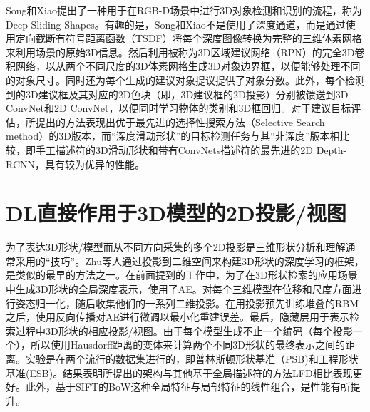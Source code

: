 \documentclass[twoside,UTF8]{nputhesis}
\begin{document}
Song和Xiao\cite{Song2015Deep}提出了一种用于在RGB-D场景中进行3D对象检测和识别的流程，称为Deep Sliding Shapes。有趣的是，Song和Xiao不是使用了深度通道，而是通过使用定向截断有符号距离函数（TSDF）将每个深度图像转换为完整的三维体素网格来利用场景的原始3D信息。然后利用被称为3D区域建议网络（RPN）的完全3D卷积网络，以从两个不同尺度的3D体素网格生成3D对象边界框，以便能够处理不同的对象尺寸。同时还为每个生成的建议对象提议提供了对象分数。此外，每个检测到的3D建议框及其对应的2D色块（即，3D建议框的2D投影）分别被馈送到3D ConvNet和2D ConvNet，以便同时学习物体的类别和3D框回归。对于建议目标评估，所提出的方法表现出优于最先进的选择性搜索方法（Selective Search method）\cite{Uijlings2013Selective}的3D版本，而“深度滑动形状”\cite{Song2015Deep}的目标检测任务与其“非深度”版本相比较，即手工描述符的3D滑动形状\cite{Song2014Sliding}和带有ConvNets描述符的最先进的2D Depth-RCNN\cite{Gupta2014Learning}，具有较为优异的性能。


\section{DL直接作用于3D模型的2D投影/视图}
为了表达3D形状/模型而从不同方向采集的多个2D投影是三维形状分析和理解通常采用的“技巧”。Zhu等人\cite{}通过投影到二维空间来构建3D形状的深度学习的框架，是类似的最早的方法之一。在前面提到的工作中，为了在3D形状检索的应用场景中生成3D形状的全局深度表示，使用了AE。对每个三维模型在位移和尺度方面进行姿态归一化，随后收集他们的一系列二维投影。在用投影预先训练堆叠的RBM之后，使用反向传播对AE进行微调以最小化重建误差。最后，隐藏层用于表示检索过程中3D形状的相应投影/视图。由于每个模型生成不止一个编码（每个投影一个），所以使用Hausdorff距离的变体来计算两个不同3D形状的最终表示之间的距离。实验是在两个流行的数据集进行的，即普林斯顿形状基准（PSB)\cite{}和工程形状基准(ESB)\cite{}。结果表明所提出的架构与其他基于全局描述符的方法LFD\cite{}相比表现更好。此外，基于SIFT的BoW这种全局特征与局部特征的线性组合，是性能有所提升。
\end{document}
